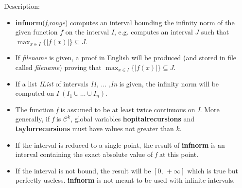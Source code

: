 \noindent Description: \begin{itemize}

\item \textbf{infnorm}(\emph{f},\emph{range}) computes an interval bounding the infinity norm of the 
   given function $f$ on the interval $I$, e.g. computes an interval $J$
   such that $\max_{x \in I} \{|f(x)|\} \subseteq J$.

\item If \emph{filename} is given, a proof in English will be produced (and stored in file
   called \emph{filename}) proving that  $\max_{x \in I} \{|f(x)|\} \subseteq J$.

\item If a list \emph{IList} of intervals \emph{I1}, ... ,\emph{In} is given, the infinity norm will
   be computed on $I \ (I_1 \cup \dots \cup I_n)$.

\item The function \emph{f} is assumed to be at least twice continuous on \emph{I}. More 
   generally, if \emph{f} is $\mathcal{C}^k$, global variables \textbf{hopitalrecursions} and
   \textbf{taylorrecursions} must have values not greater than $k$.  

\item If the interval is reduced to a single point, the result of \textbf{infnorm} is an 
   interval containing the exact absolute value of \emph{f} at this point.

\item If the interval is not bound, the result will be $[0,\,+\infty]$ 
   which is true but perfectly useless. \textbf{infnorm} is not meant to be used with 
   infinite intervals.


\end{itemize}
